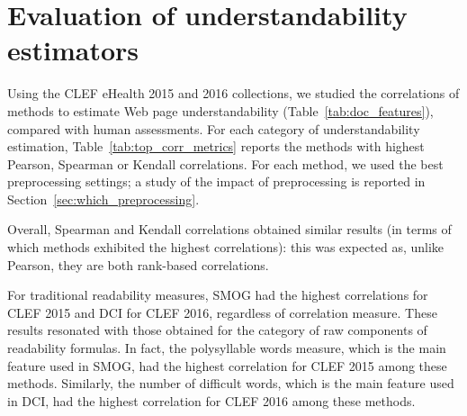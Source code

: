 \section{Evaluation of understandability estimators}
\label{sec:beyond_readability}




Using the CLEF eHealth 2015 and 2016 collections, we studied the correlations of methods to estimate Web page understandability (Table~\ref{tab:doc_features}), compared with human assessments. For each category of understandability estimation, Table~\ref{tab:top_corr_metrics} reports the methods with highest Pearson, Spearman or Kendall correlations. For each method, we used the best preprocessing settings; a study of the impact of preprocessing is reported in Section~\ref{sec:which_preprocessing}.

Overall, Spearman and Kendall correlations obtained similar results (in terms of which methods exhibited the highest correlations): this was expected as, unlike Pearson, they are both rank-based correlations.

For traditional readability measures, SMOG had the highest correlations for CLEF 2015 and DCI for CLEF 2016, regardless of correlation measure. These results resonated with those obtained for the category of raw components of readability formulas. %
In fact, the polysyllable words measure, which is the main feature used in SMOG, had the highest correlation for CLEF 2015 among these methods. Similarly, the number of difficult words, which is the main feature used in DCI, had the highest correlation for CLEF 2016 among these methods.

